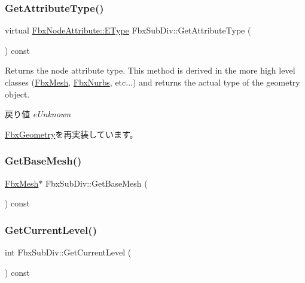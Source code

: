 \subsubsection{\texorpdfstring{Get\+Attribute\+Type()}{GetAttributeType()}}
{\footnotesize\ttfamily virtual \hyperlink{class_fbx_node_attribute_a08e1669d3d1a696910756ab17de56d6a}{Fbx\+Node\+Attribute\+::\+E\+Type} Fbx\+Sub\+Div\+::\+Get\+Attribute\+Type (\begin{DoxyParamCaption}{ }\end{DoxyParamCaption}) const\hspace{0.3cm}{\ttfamily [virtual]}}

Returns the node attribute type. This method is derived in the more high level classes (\hyperlink{class_fbx_mesh}{Fbx\+Mesh}, \hyperlink{class_fbx_nurbs}{Fbx\+Nurbs}, etc...) and returns the actual type of the geometry object.

\begin{DoxyReturn}{戻り値}
{\itshape e\+Unknown} 
\end{DoxyReturn}


\hyperlink{class_fbx_geometry_a41ae23e5d0cf08693bca49737f333de9}{Fbx\+Geometry}を再実装しています。

\mbox{\label{class_fbx_sub_div_a8b14dd17531d8e7e970a0f27061c992c}} 
\subsubsection{\texorpdfstring{Get\+Base\+Mesh()}{GetBaseMesh()}}
{\footnotesize\ttfamily \hyperlink{class_fbx_mesh}{Fbx\+Mesh}$\ast$ Fbx\+Sub\+Div\+::\+Get\+Base\+Mesh (\begin{DoxyParamCaption}{ }\end{DoxyParamCaption}) const}

\mbox{\label{class_fbx_sub_div_a76ae5f09e9af063bfdfa8bbbcdcf5b33}} 
\subsubsection{\texorpdfstring{Get\+Current\+Level()}{GetCurrentLevel()}}
{\footnotesize\ttfamily int Fbx\+Sub\+Div\+::\+Get\+Current\+Level (\begin{DoxyParamCaption}{ }\end{DoxyParamCaption}) const}


